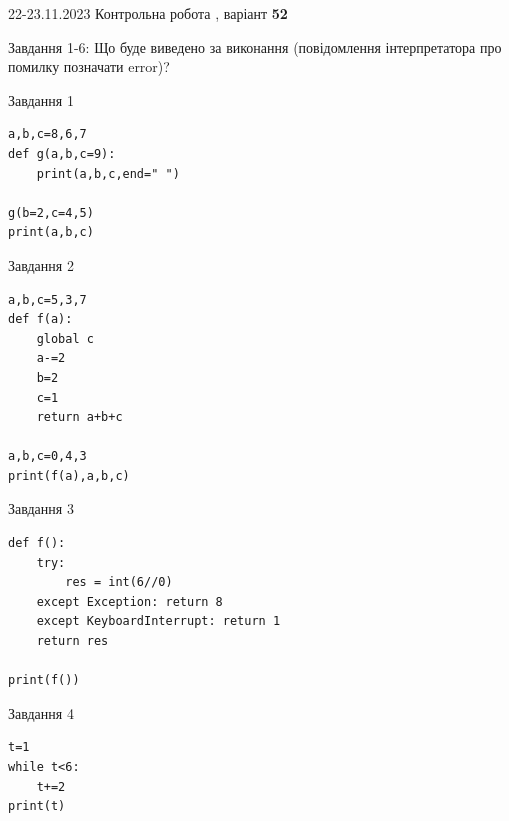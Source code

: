 \documentclass[12pt, ukrainian]{article}
\begin{document}
{{22-23.11.2023 Контрольна робота , варіант  \No \textbf { 52 }\par}}
{

Завдання 1-6: Що буде виведено за виконання (повідомлення інтерпретатора про помилку позначати error)?


\begin{minipage}[t]{9.7cm}                
{\begin{center}Завдання {1}\end{center}}
\begin{verbatim}
a,b,c=8,6,7
def g(a,b,c=9):
    print(a,b,c,end=" ")

g(b=2,c=4,5)
print(a,b,c)
\end{verbatim}     
\end{minipage}
\vline \hspace{8mm}
\begin{minipage}[t]{8.0cm}                
{\begin{center}Завдання {2}\end{center}}
\begin{verbatim}
a,b,c=5,3,7
def f(a):
    global c
    a-=2
    b=2
    c=1
    return a+b+c

a,b,c=0,4,3
print(f(a),a,b,c)
\end{verbatim}     
\end{minipage}

\vspace{15mm}
\begin{minipage}[t]{9.7cm}                
{\begin{center}Завдання {3}\end{center}}
\begin{verbatim}
def f():
    try:
        res = int(6//0)
    except Exception: return 8
    except KeyboardInterrupt: return 1
    return res

print(f())
\end{verbatim}     
\end{minipage}
\vline \hspace{8mm}
\begin{minipage}[t]{8.0cm}                
{\begin{center}Завдання {4}\end{center}}
\begin{verbatim}
t=1
while t<6:
    t+=2
print(t)
\end{verbatim}     
\end{minipage}

}
\end{document}
